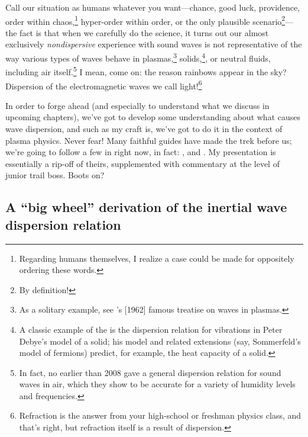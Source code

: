 Call our situation as humans whatever you want---chance, good luck, providence,
order within chaos,\footnote{Regarding humans themselves, I realize a case could
  be made for oppositely ordering these words.}  hyper-order within order, or
the only plausible scenario\footnote{By definition!}---the fact is that when we
carefully do the science, it turns out our almost exclusively
\emph{nondispersive} experience with sound waves is not representative of the
way various types of waves behave in plasmas,\footnote{As a solitary example,
  see \citeauthor{Stix1962}'s [1962] famous treatise on waves in plasmas.}
solids,\footnote{A classic example of the is the dispersion relation for
  vibrations in Peter Debye's model of a solid; his model and related extensions
  (say, Sommerfeld's model of fermions) predict, for example, the heat capacity
  of a solid.}, or neutral fluids, including air itself.\footnote{In fact, no
  earlier than 2008 \citeauthor{Alvarez2008} gave a general dispersion relation
  for sound waves in air, which they show to be accurate for a variety of
  humidity levels and frequencies.}  I mean, come on: the reason rainbows appear
in the sky?  Dispersion of the electromagnetic waves we call
light!\footnote{Refraction is the answer from your high-school or freshman
  physics class, and that's right, but refraction itself is a result of
  dispersion.}

In order to forge ahead (and especially to understand what we discuss in
upcoming chapters), we've got to develop some understanding about what causes
wave dispersion, and such as my craft is, we've got to do it in the context of
plasma physics. Never fear! Many faithful guides have made the trek before us;
we're going to follow a few in right now, in fact: \citet{Goertz1979}, and
\citet{Kletzing1994}. My presentation is essentially a rip-off of theirs,
supplemented with commentary at the level of junior trail boss. Boots on?

\subsection[A ``big wheel'' derivation of the IAW dispersion
relation]{A ``big wheel'' derivation of the inertial \Alf wave dispersion
  relation} \label{ch1:ssDerivation}

